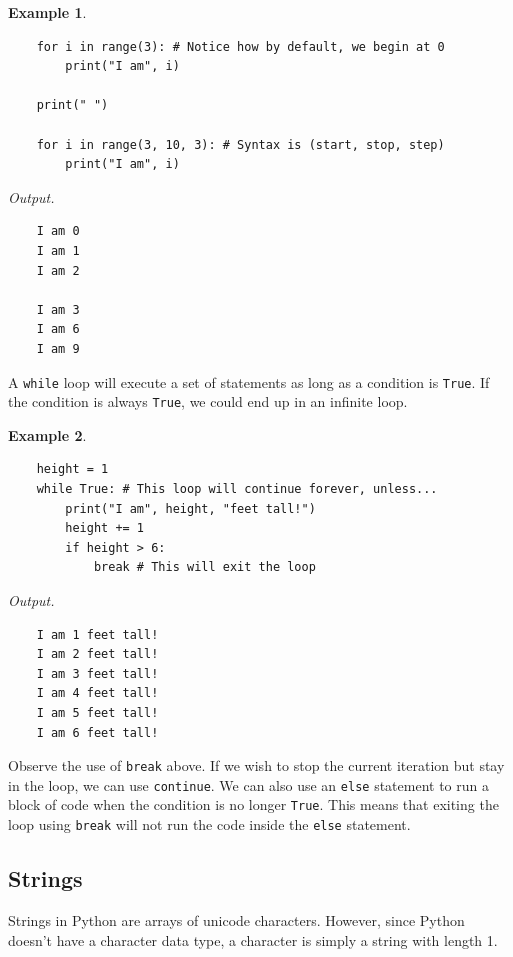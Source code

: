 \documentclass[11pt]{scrartcl}
\theoremstyle{definition}
\newtheorem*{example}{Example}
\begin{document}
\begin{example}
    \
\begin{verbatim}
    for i in range(3): # Notice how by default, we begin at 0
        print("I am", i)

    print(" ")

    for i in range(3, 10, 3): # Syntax is (start, stop, step)
        print("I am", i)
\end{verbatim}
    \textit{Output.}
\begin{verbatim}
    I am 0
    I am 1
    I am 2
     
    I am 3
    I am 6
    I am 9
\end{verbatim}
\end{example}

A \texttt{while} loop will execute a set of statements as long as a condition is 
\texttt{True}. If the condition is always \texttt{True}, we could end up in an 
infinite loop. 

\begin{example}
    \
\begin{verbatim}
    height = 1
    while True: # This loop will continue forever, unless...
        print("I am", height, "feet tall!")
        height += 1
        if height > 6:
            break # This will exit the loop
\end{verbatim}
    \textit{Output.}
\begin{verbatim}
    I am 1 feet tall!
    I am 2 feet tall!
    I am 3 feet tall!
    I am 4 feet tall!
    I am 5 feet tall!
    I am 6 feet tall!
\end{verbatim}
\end{example}

Observe the use of \texttt{break} above. If we wish to stop the current iteration but stay in the 
loop, we can use \texttt{continue}. We can also use an \texttt{else} statement to run 
a block of code when the condition is no longer \texttt{True}. This means that exiting the loop 
using \texttt{break} will not run the code inside the \texttt{else} statement.

\subsection{Strings}

Strings in Python are arrays of unicode characters. However, since Python doesn't have a character data type, a 
character is simply a string with length 1. \\[-0.5em]
\end{document}
